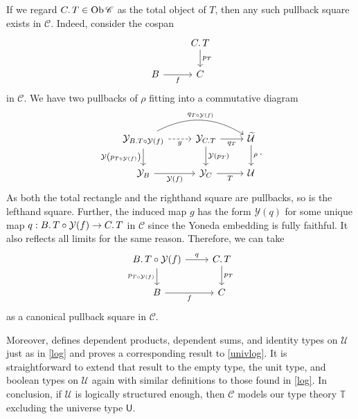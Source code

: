 \documentclass[10pt,letterpaper,cm]{nupset}
\theoremstyle{definition}
\theoremstyle{theorem}
\theoremstyle{remark}
\DeclareMathOperator{\ob}{Ob}
\newcommand{\U}{\mathsf{U}}
\newcommand{\0}{\mathbf{0}}
\newcommand{\1}{\mathbf{1}}
\newcommand{\2}{\mathbf{2}}
\renewcommand{\c}{\mathscr{C}}
\newcommand{\T}{\mathbb T}
\begin{document}
If we regard $C\ldotp{T} \in \ob{\c}$ as the total object of $T$, then any such pullback square exists in $\c$. Indeed, consider the cospan 
\[
\begin{tikzcd}
                  & C\ldotp{T} \arrow[d, "{p}_T"] \\
B \arrow[r, "f"'] & C                                  
\end{tikzcd}
\] in $\c$. We have two pullbacks of $\rho$ fitting into a commutative diagram
\[
\begin{tikzcd}
\mathcal{Y}_{B\ldotp{T \circ \mathcal{Y}(f)}} \arrow[d, "\mathcal{Y}\left(p_{T\circ \mathcal{Y}(f)}\right)"'] \arrow[r, "g"', dashed] \arrow[rr, "q_{T \circ \mathcal{Y}(f)}", bend left] & \mathcal{Y}_{C\ldotp{T}} \arrow[d, "\mathcal{Y}({p}_T)"] \arrow[r, "q_T"'] & \widetilde{\mathcal{U}} \arrow[d, "\rho"] \\
\mathcal{Y}_B \arrow[r, "\mathcal{Y}(f)"']                                                                                                    & \mathcal{Y}_C \arrow[r, "T"']                                 & \mathcal{U}                              
\end{tikzcd}.
\] As both the total rectangle and the righthand square are pullbacks, so is the lefthand square. Further,  the induced map $g$ has the form $\mathcal{Y}(q)$ for some unique map $q : B\ldotp{T\circ \mathcal{Y}(f)} \to C\ldotp{T}$ in $\c$ since the Yoneda embedding is fully faithful.  It also reflects all limits for the same reason. Therefore, we can take
\[
\begin{tikzcd}
B\ldotp{T\circ \mathcal{Y}(f)} \arrow[d, "p_{T\circ \mathcal{Y}(f)}"'] \arrow[r, "q"] & C\ldotp{T} \arrow[d, "{p}_T"] \\
B \arrow[r, "f"']                                                 & C                            
\end{tikzcd}
\] as a canonical pullback square in $\c$.

\medskip

Moreover, \cite{Nat} defines dependent products, dependent sums, and identity types on $\mathcal{U}$ just as in \cref{log} and proves a corresponding result to \cref{univlog}. It is straightforward to extend that result to the empty type, the unit type, and boolean types on $\mathcal{U}$ again with similar definitions  to those found in \cref{log}. 
In conclusion, if $\mathcal{U}$ is logically structured enough, then $\c$ models our type theory $\T$ excluding the universe type $\U$.

\medskip
\end{document}
